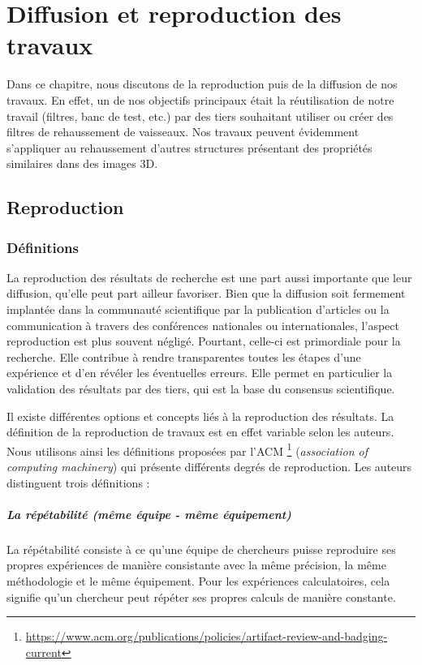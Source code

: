 \chapter{Diffusion et reproduction des travaux}
\label{sec:reproductibility}

Dans ce chapitre, nous discutons de la reproduction puis de la diffusion de nos travaux. En effet, un de nos objectifs principaux était la réutilisation de notre travail (filtres, banc de test, etc.) par des tiers souhaitant utiliser ou créer des filtres de rehaussement de vaisseaux. Nos travaux peuvent évidemment s'appliquer au rehaussement d'autres structures présentant des propriétés similaires dans des images 3D.

\section{Reproduction}
\subsection{Définitions}

La reproduction des résultats de recherche est une part aussi importante que leur diffusion, qu'elle peut part ailleur favoriser. Bien que la diffusion soit fermement implantée dans la communauté scientifique par la publication d'articles ou la communication à travers des conférences nationales ou internationales, l'aspect reproduction est plus souvent négligé. Pourtant, celle-ci est primordiale pour la recherche. Elle contribue à rendre transparentes toutes les étapes d'une expérience et d'en révéler les éventuelles erreurs. Elle permet en particulier la validation des résultats par des tiers, qui est la base du consensus scientifique.

Il existe différentes options et concepts liés à la reproduction des résultats. La définition de la reproduction de travaux est en effet variable selon les auteurs. Nous utilisons ainsi les définitions proposées par l'ACM \footnote{\url{https://www.acm.org/publications/policies/artifact-review-and-badging-current}} (\textit{association of computing machinery}) qui présente différents degrés de reproduction. Les auteurs distinguent trois définitions : 

\paragraph{La répétabilité (même équipe - même équipement)}

La répétabilité consiste à ce qu'une équipe de chercheurs puisse reproduire ses propres expériences de manière consistante avec la même précision, la même méthodologie et le même équipement. Pour les expériences calculatoires, cela signifie qu'un chercheur peut répéter ses propres calculs de manière constante.


